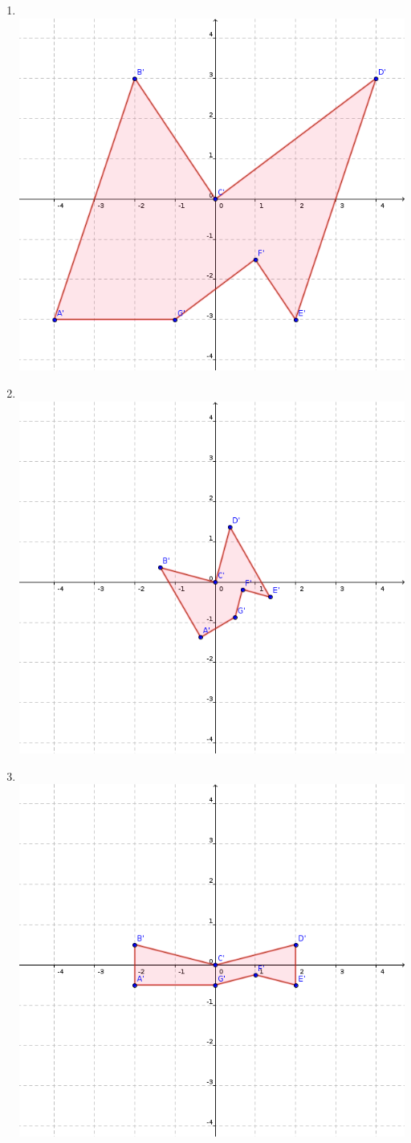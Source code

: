 \documentclass[a4paper]{article}
\begin{document}
\begin{enumerate}
\begin{multicols}{2}
\begin{enumerate} [label=(\alph*)]
		\item ~\vspace{-5mm} \\ \includegraphics[width=0.7\linewidth]{images/4}
		\item ~\vspace{-5mm} \\ \includegraphics[width=0.7\linewidth]{images/5}
		\item ~\vspace{-5mm} \\ \includegraphics[width=0.7\linewidth]{images/6}

\end{enumerate}
\end{multicols}
\end{enumerate}
\end{document}

